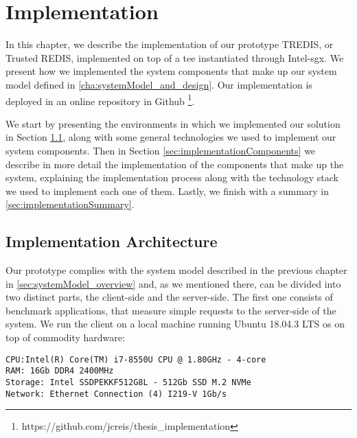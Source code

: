 \chapter{Implementation}
\label{cha:implementation}

In this chapter, we describe the implementation of our prototype TREDIS, or Trusted REDIS, implemented on top of a \gls{tee} instantiated through Intel-\gls{sgx}. 
We present how we implemented the system components that make up our system model defined in \ref{cha:systemModel_and_design}.
Our implementation is deployed in an online repository in Github \footnote{https://github.com/jcreis/thesis\_implementation}.

We start by presenting the environments in which we implemented our solution in Section \ref{sec:implementationArchitecture}, along with some general technologies we used to implement our system components. Then in Section \ref{sec:implementationComponents} we describe in more detail the implementation of the components that make up the system, explaining the implementation process along with the technology stack we used to implement each one of them. Lastly, we finish with a summary in \ref{sec:implementationSummary}.


\section{Implementation Architecture}
\label{sec:implementationArchitecture}

Our prototype complies with the system model described in the previous chapter in \ref{sec:systemModel_overview} and, as we mentioned there, can be divided into two distinct parts, the client-side and the server-side.
The first one consists of benchmark applications, that measure simple requests to the server-side of the system. We run the client on a local machine running Ubuntu 18.04.3 LTS \gls{os} on top of commodity hardware:
\vspace{5mm}
\begin{lstlisting}
CPU:Intel(R) Core(TM) i7-8550U CPU @ 1.80GHz - 4-core
RAM: 16Gb DDR4 2400MHz
Storage: Intel SSDPEKKF512G8L - 512Gb SSD M.2 NVMe
Network: Ethernet Connection (4) I219-V 1Gb/s
\end{lstlisting} 
\vspace{3mm}

